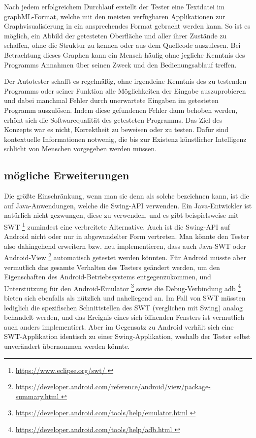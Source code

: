 Nach jedem erfolgreichem Durchlauf erstellt der Tester
eine Textdatei im graphML-Format, welche mit den meisten
verfügbaren Applikationen zur Graphvisualisierung in ein
ansprechendes Format gebracht werden kann. So ist es möglich,
ein Abbild der getesteten Oberfläche und aller ihrer Zustände 
zu schaffen, ohne die Struktur zu kennen oder aus dem Quellcode auszulesen.
Bei Betrachtung dieses Graphen kann ein Mensch häufig
ohne jegliche Kenntnis des Programms Annahmen über seinen Zweck
und den Bedienungsablauf treffen.

Der Autotester schafft es regelmäßig, ohne irgendeine Kenntnis des zu
testenden Programms oder seiner Funktion alle Möglichkeiten
der Eingabe auszuprobieren und dabei manchmal Fehler durch unerwartete
Eingaben im getesteten Programm auszulösen.
Indem diese gefundenen Fehler dann behoben werden, erhöht sich die
Softwarequalität des getesteten Programms. Das Ziel des Konzepts
war es nicht, Korrektheit zu beweisen oder zu testen. Dafür
sind kontextuelle Informationen notwenig, die bis zur Existenz
künstlicher Intelligenz schlicht von Menschen vorgegeben werden müssen.


\subsection{mögliche Erweiterungen}

Die größte Einschränkung, wenn man sie denn als solche bezeichnen
kann, ist die auf Java-Anwendungen, welche die Swing-API verwenden.
Ein Java-Entwickler ist natürlich nicht gezwungen, diese zu verwenden,
und es gibt beispielsweise mit SWT
\footnote{ \url{ https://www.eclipse.org/swt/ }} zumindest eine 
verbreitete Alternative. Auch ist die Swing-API auf Android
nicht oder nur in abgewandelter Form vertreten. Man könnte
den Tester also dahingehend erweitern bzw. neu implementieren,
dass auch Java-SWT oder Android-View
\footnote{ \url{ https://developer.android.com/reference/android/view/package-summary.html }} 
automatisch getestet werden könnten. Für Android müsste aber
vermutlich das gesamte Verhalten des Testers geändert werden,
um den Eigenschaften des Android-Betriebssystems entgegenzukommen,
und Unterstützung für den Android-Emulator
\footnote{ \url{ https://developer.android.com/tools/help/emulator.html }} 
sowie die Debug-Verbindung adb
\footnote{ \url{ https://developer.android.com/tools/help/adb.html }} 
bieten sich ebenfalls als nützlich und naheliegend an.
Im Fall von SWT müssten lediglich die spezifischen Schnittstellen
des SWT (verglichen mit Swing) analog behandelt werden, und 
das Ereignis eines sich öffnenden Fensters ist vermutlich auch
anders implementiert. Aber im Gegensatz zu Android verhält
sich eine SWT-Applikation identisch zu einer Swing-Applikation,
weshalb der Tester selbst unverändert übernommen werden könnte.

